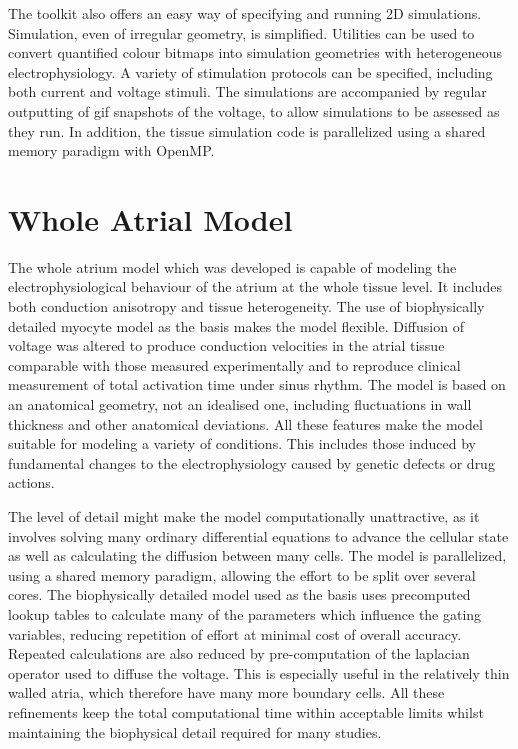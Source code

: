 The toolkit also offers an easy way of specifying and running 2D simulations.
Simulation, even of irregular geometry, is simplified.
Utilities can be used to convert quantified colour bitmaps into simulation
geometries with heterogeneous electrophysiology.
A variety of stimulation protocols can be specified, including both current and
voltage stimuli.
The simulations are accompanied by regular outputting of gif snapshots of the
voltage, to allow simulations to be assessed as they run.
In addition, the tissue simulation code is parallelized using a shared memory
paradigm with OpenMP.

\section{Whole Atrial Model}

The whole atrium model which was developed is capable of modeling the
electrophysiological behaviour of the atrium at the whole tissue level.
It includes both conduction anisotropy and tissue heterogeneity.
The use of biophysically detailed myocyte model as the basis makes the model
flexible.
Diffusion of voltage was altered to produce conduction velocities in the atrial
tissue comparable with those measured experimentally and to reproduce clinical
measurement of total activation time under sinus rhythm.
The model is based on an anatomical geometry, not an idealised one, including
fluctuations in wall thickness and other anatomical deviations.
All these features make the model suitable for modeling a variety of conditions.
This includes those induced by fundamental changes to the electrophysiology
caused by genetic defects or drug actions.

The level of detail might make the model computationally unattractive, as it
involves solving many ordinary differential equations to advance the cellular
state as well as calculating the diffusion between many cells.
The model is parallelized, using a shared memory paradigm, allowing the effort
to be split over several cores.
The biophysically detailed model used as the basis uses precomputed lookup
tables to calculate many of the parameters which influence the gating variables,
reducing repetition of effort at minimal cost of overall accuracy.
Repeated calculations are also reduced by pre-computation of the laplacian
operator used to diffuse the voltage.
This is especially useful in the relatively thin walled atria, which therefore
have many more boundary cells.
All these refinements keep the total computational time within acceptable limits
whilst maintaining the biophysical detail required for many studies.

